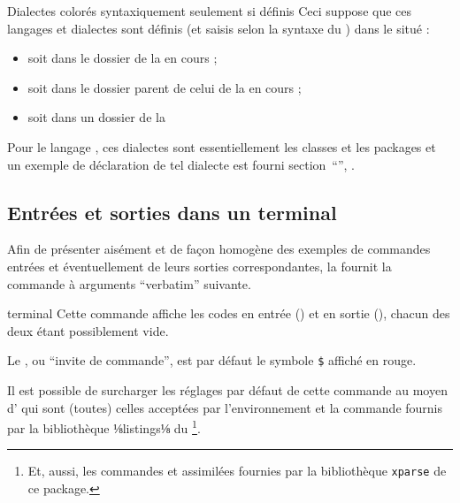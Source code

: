 \documentclass{letgut}
\begin{document}
\begin{dbwarning}{Dialectes colorés syntaxiquement seulement si définis}{}
  Ceci suppose que ces langages et dialectes sont définis (et saisis selon la
  syntaxe du ) dans le  situé :
  \begin{itemize}
  \item soit dans le dossier de la  en cours ;
  \item soit dans le dossier parent de celui de la  en cours ;
  \item soit  dans un dossier de la \tds{}
  \end{itemize}
\end{dbwarning}

Pour le langage , ces dialectes sont essentiellement les classes et
les packages  et un exemple de déclaration de tel dialecte est
fourni section~\enquote{},
.

\subsection{Entrées et sorties dans un terminal}
\label{sec:entrees-sorties}

Afin de présenter aisément et de façon homogène des exemples de commandes
entrées et éventuellement de leurs sorties correspondantes, la 
fournit la commande à arguments \enquote{verbatim} suivante.

\begin{docCommand}{terminal}{}
  Cette commande affiche les codes en entrée () et en sortie
  (), chacun des deux étant possiblement vide.

  Le , ou \enquote{invite de commande}, est par défaut le symbole
  \texttt{\$} affiché en rouge.

  Il est possible de surcharger les réglages par défaut de cette commande au
  moyen d' qui sont (toutes) celles acceptées par l'environnement
   et la commande 
  fournis par la bibliothèque ⅛listings⅛ du \footnote{Et,
    aussi, les commandes  et assimilées
    fournies par la bibliothèque \lstinline+xparse+ de ce package.}.
\end{docCommand}
\end{document}
